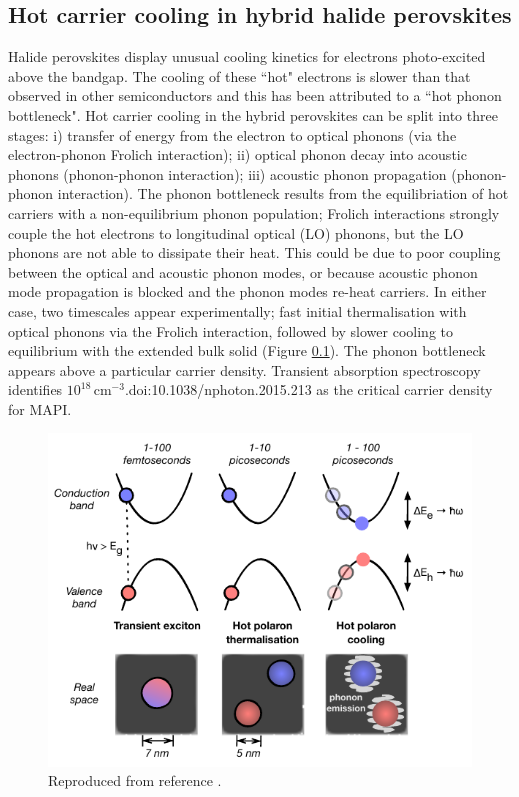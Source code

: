\subsection{Hot carrier cooling in hybrid halide perovskites}

Halide perovskites display unusual cooling kinetics for electrons photo-excited above the bandgap.%
The cooling of these ``hot" electrons is slower than that observed in other semiconductors and this has been attributed to a ``hot phonon bottleneck".\cite{} %
Hot carrier cooling in the hybrid perovskites can be split into three stages: i) transfer of energy from the electron to optical phonons (via the electron-phonon Frolich interaction); ii) optical phonon decay into acoustic phonons (phonon-phonon interaction); iii) acoustic phonon propagation (phonon-phonon interaction).
The phonon bottleneck results from the equilibriation of hot carriers with a non-equilibrium phonon population;
Frolich interactions strongly couple the hot electrons to longitudinal optical (LO) phonons, but the LO phonons are not able to dissipate their heat. 
This could be due to poor coupling between the optical and acoustic phonon modes, or because acoustic phonon mode propagation is blocked and the phonon modes re-heat carriers.
In either case, two timescales appear experimentally; fast initial thermalisation with optical phonons via the Frolich interaction, followed by slower cooling to equilibrium with the extended bulk solid (Figure \ref{}).
The phonon bottleneck appears above a particular carrier density. Transient absorption spectroscopy identifies  $10^18\,\textrm{cm}^{-3}$.doi:10.1038/nphoton.2015.213 as the critical carrier density for MAPI.

\begin{figure}[h!]
\centering
  \includegraphics[width=0.7\columnwidth]{figures/ch5/f1.pdf}
  \caption[Hot carrier cooling model]{Reproduced from reference \cite{Whalley2017a}.}
\label{cooling_schematic}
\end{figure}

